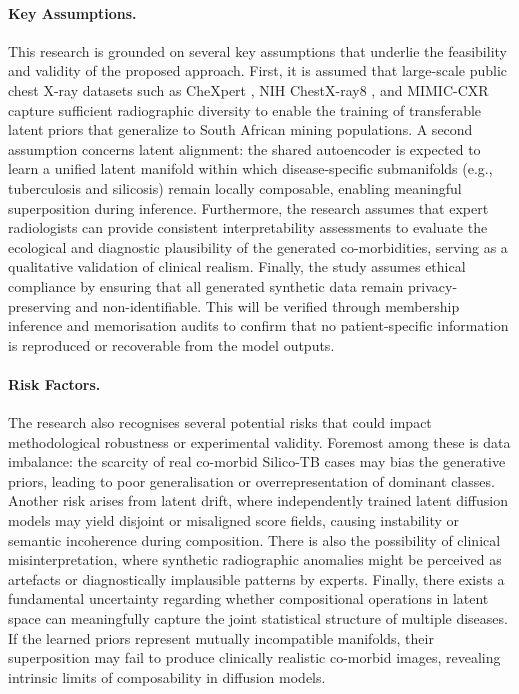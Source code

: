 \paragraph{Key Assumptions.}
This research is grounded on several key assumptions that underlie the feasibility and validity of the proposed approach.  
First, it is assumed that large-scale public chest X-ray datasets such as CheXpert \citep{Chexpert}, NIH ChestX-ray8 \citep{wang2017chestxray8}, and MIMIC-CXR \citep{johnson2016mimiciii_dataset} capture sufficient radiographic diversity to enable the training of transferable latent priors that generalize to South African mining populations.  
A second assumption concerns latent alignment: the shared autoencoder is expected to learn a unified latent manifold within which disease-specific submanifolds (e.g., tuberculosis and silicosis) remain locally composable, enabling meaningful superposition during inference.  
Furthermore, the research assumes that expert radiologists can provide consistent interpretability assessments to evaluate the ecological and diagnostic plausibility of the generated co-morbidities, serving as a qualitative validation of clinical realism.  
Finally, the study assumes ethical compliance by ensuring that all generated synthetic data remain privacy-preserving and non-identifiable. This will be verified through membership inference and memorisation audits to confirm that no patient-specific information is reproduced or recoverable from the model outputs.

\paragraph{Risk Factors.}
The research also recognises several potential risks that could impact methodological robustness or experimental validity.  
Foremost among these is data imbalance: the scarcity of real co-morbid Silico-TB cases may bias the generative priors, leading to poor generalisation or overrepresentation of dominant classes.  
Another risk arises from latent drift, where independently trained latent diffusion models may yield disjoint or misaligned score fields, causing instability or semantic incoherence during composition.  
There is also the possibility of clinical misinterpretation, where synthetic radiographic anomalies might be perceived as artefacts or diagnostically implausible patterns by experts.  
Finally, there exists a fundamental uncertainty regarding whether compositional operations in latent space can meaningfully capture the joint statistical structure of multiple diseases.  
If the learned priors represent mutually incompatible manifolds, their superposition may fail to produce clinically realistic co-morbid images, revealing intrinsic limits of composability in diffusion models.

